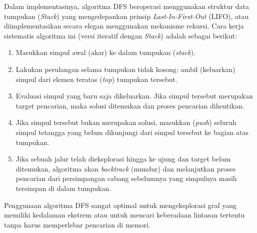 \documentclass[12pt]{article}
\begin{document}
Dalam implementasinya, algoritma DFS beroperasi menggunakan struktur data tumpukan (\textit{Stack}) yang mengedepankan prinsip \textit{Last-In-First-Out} (LIFO), atau diimplementasikan secara elegan menggunakan mekanisme rekursi. Cara kerja sistematis algoritma ini (versi iteratif dengan \textit{Stack}) adalah sebagai berikut:
\begin{enumerate}
    \item Masukkan simpul awal (akar) ke dalam tumpukan (\textit{stack}).
    \item Lakukan perulangan selama tumpukan tidak kosong: ambil (keluarkan) simpul dari elemen teratas (\textit{top}) tumpukan tersebut.
    \item Evaluasi simpul yang baru saja dikeluarkan. Jika simpul tersebut merupakan target pencarian, maka solusi ditemukan dan proses pencarian dihentikan.
    \item Jika simpul tersebut bukan merupakan solusi, masukkan (\textit{push}) seluruh simpul tetangga yang belum dikunjungi dari simpul tersebut ke bagian atas tumpukan. 
    \item Jika sebuah jalur telah dieksplorasi hingga ke ujung dan target belum ditemukan, algoritma akan \textit{backtrack} (mundur) dan melanjutkan proses pencarian dari persimpangan cabang sebelumnya yang simpulnya masih tersimpan di dalam tumpukan.
\end{enumerate}

Penggunaan algoritma DFS sangat optimal untuk mengeksplorasi graf yang memiliki kedalaman ekstrem atau untuk mencari keberadaan lintasan tertentu tanpa harus memperlebar pencarian di memori.
\end{document}
